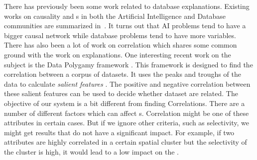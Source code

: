 There has previously been some work related to database explanations. 
Existing works on causality and {\explanation}s in both the Artificial Intelligence and Database communities are summarized in~\cite{meliou2014causality}. It turns out that AI problems tend to have a bigger causal network while database problems tend to have more variables.
There has also been a lot of work on correlation which shares some common ground with the work on explanations. One interesting recent work on the subject is the Data Polygamy framework \cite{chirigati2016data}. This framework is designed to find the correlation between a corpus of datasets. It uses the peaks and troughs of the data to calculate \textit{salient features} \cite{dunn1986applied}. The positive and negative correlation between these salient features can be used to decide whether dataset are related\cite{su2014supporting}. The objective of our system is a bit different from finding Correlations. There are a number of different factors which can affect {\fact}s. Correlation might be one of these attributes in certain cases. But if we ignore other criteria, such as selectivity, we might get results that do not have a significant impact. For example, if two attributes are highly correlated in a certain spatial cluster but the selectivity of the cluster is high, it would lead to a low impact on the {\fact}.





